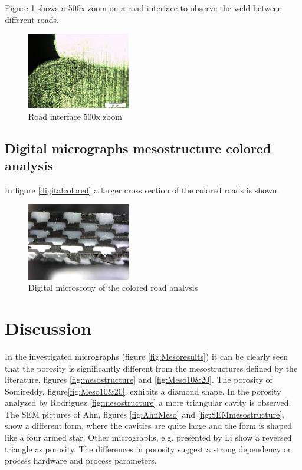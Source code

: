 Figure \ref{fig:colored road 500x zoom} shows a 500x zoom on a road interface to observe the weld between different roads.
\begin{figure}[H]
    \centering
    \includegraphics[width=0.40\textwidth]{chapter_4_RVE_Definition/figures/colored/Tv89_LI.jpg}
    \caption{Road interface 500x zoom}
    \label{fig:colored road 500x zoom}
\end{figure}

\subsection{Digital micrographs  mesostructure colored analysis}

In figure \ref{digitalcolored} a larger cross section of the colored roads is shown.
\begin{figure}[H]
    \centering
    \includegraphics[width=0.40\textwidth]{chapter_4_RVE_Definition/figures/colored/Digitalcolored.jpg}
    \caption{Digital microscopy of the colored road analysis}
    \label{fig:digitalcolored}
\end{figure}

\section{Discussion}

In the investigated micrographs (figure \ref{fig:Mesoresults}) it can be clearly seen that the porosity is significantly different from the mesostructures defined by the literature, figures \ref{fig:mesostructure} and \ref{fig:Meso10&20}. The porosity of Somireddy, figure\ref{fig:Meso10&20}, exhibits a diamond shape. In the porosity analyzed by Rodriguez \ref{fig:mesostructure} a more triangular cavity is observed. The SEM pictures of Ahn, figures \ref{fig:AhnMeso} and \ref{fig:SEMmesostructure}, show a different form, where the cavities are quite large and the form is shaped like a four armed star. Other micrographs, e.g. presented by Li \cite{Li2002CompositeProperties} show a reversed triangle as porosity. The differences in porosity suggest a strong dependency on  process hardware and process parameters.

